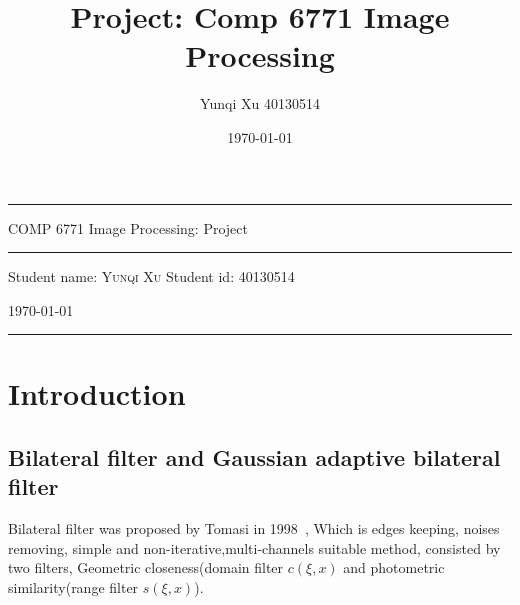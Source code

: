 \documentclass[12pt]{article}
\title{Project: Comp 6771 Image Processing}
\author{Yunqi Xu 40130514}
\date{\today}
\begin{document}
\begin{titlepage}
  \rule{\textwidth}{1pt}   %
    \vspace{0.2\textheight}  %


    {\Huge COMP 6771 Image Processing: Project}

    \vspace{0.025\textheight}   %

    \rule{0.83\textwidth}{0.4pt}  %

    \vspace{0.1\textheight}  %


    {\Large Student name: \textsc{Yunqi Xu}}
    \vfill
    {\Large Student id: 40130514}
    \vfill  %

    {\large \today}
    \vspace{0.1\textheight}  %


    \rule{\textwidth}{1pt}  %
\end{titlepage}

\section{Introduction}
\subsection{Bilateral filter and Gaussian adaptive bilateral filter}
\label{subsection review bilateral}
Bilateral filter was proposed by Tomasi in 1998~\cite{paper_bf}, Which is edges keeping, noises removing, simple and non-iterative,multi-channels suitable method, consisted by two filters, Geometric closeness(domain filter $c(\xi, x)$ and photometric similarity(range filter $s(\xi, x)$).  
\end{document}
